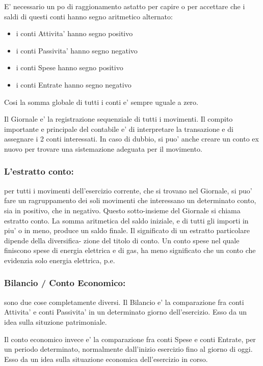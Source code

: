 \documentclass[12pt]{report}
\begin{document}
E' necessario un po di raggionamento astatto per capire o per accettare che
i saldi di questi conti hanno segno aritmetico alternato:

\begin{itemize}
   \item i conti Attivita'  hanno segno positivo
\item i conti Passivita' hanno segno negativo
\item i conti Spese      hanno segno positivo
\item i conti Entrate    hanno segno negativo
\end{itemize}

Cosi la somma globale di tutti i conti e' sempre uguale a zero.

Il Giornale e' la registrazione sequenziale di tutti i movimenti. Il compito
importante e principale del contabile e' di interpretare la transazione e di
assegnare i 2 conti interessati. In caso di dubbio, si puo' anche creare un
conto ex nuovo per trovare una sistemazione adeguata per il movimento.
 
\subsubsection{L'estratto conto:} per tutti i movimenti dell'esercizio
corrente, che si trovano nel Giornale, si puo' fare un ragruppamento dei soli
movimenti che interessano un determinato conto, sia in positivo, che in
negativo. Questo sotto-insieme del Giornale si chiama estratto conto. La somma
aritmetica del saldo iniziale, e di tutti gli importi in piu' o in meno,
produce un saldo finale. Il significato di un estratto particolare dipende
della diversifica- zione del titolo di conto. Un conto spese nel quale
finiscono spese di energia elettrica e di gas, ha meno significato che un conto
che evidenzia solo energia elettrica, p.e. 

\subsubsection{Bilancio / Conto Economico:} sono due cose completamente
diversi.  Il Bilancio e' la comparazione fra conti Attivita' e conti Passivita'
in un determinato giorno dell'esercizio. Esso da un idea sulla situzione
patrimoniale.

Il conto economico invece e' la comparazione fra conti Spese e conti Entrate,
per un periodo determinato, normalmente dall'inizio esercizio fino al giorno 
di oggi. Esso da un idea sulla situazione economica dell'esercizio in corso.
\end{document}
